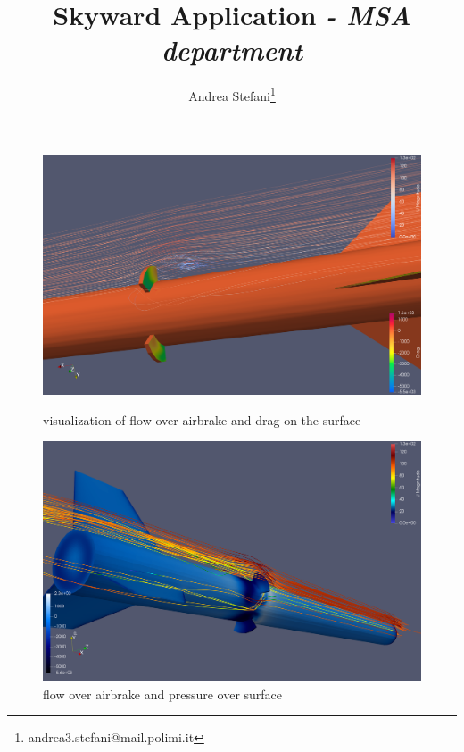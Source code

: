 \documentclass[11pt, a4paper]{article}
\title{Skyward Application \emph{- MSA department}}
\author{Andrea Stefani\thanks{andrea3.stefani@mail.polimi.it}}
\begin{document}
\maketitle 
\vspace{2cm}
\begin{figure}[ht]
\hspace*{-0.75cm}
\begin{minipage}[b]{.45\textwidth}
\includegraphics[scale=0.09]{brakes1}
\captionsetup{labelsep=space,justification=justified,singlelinecheck=off}
\caption{visualization of flow over airbrake and drag on the surface }
\end{minipage}
\hspace*{1.5cm}
\vspace{-0.2cm}
\begin{minipage}[b]{.45\textwidth}
\includegraphics[scale=0.09]{brakes3}
\captionsetup{labelsep=space,justification=justified,singlelinecheck=off}
\caption{flow over airbrake and pressure over surface\newline}

\end{minipage}
\end{figure}
\end{document}
